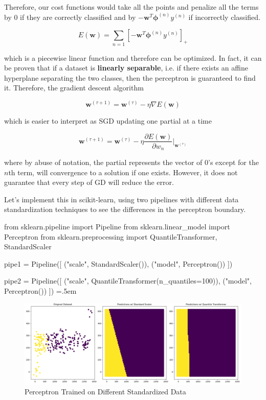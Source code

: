 \documentclass{article}
\theoremstyle{definition}
\newenvironment{cverbatim}
    {\SaveVerbatim{cverb}}
    {\endSaveVerbatim
    \flushleft\fboxrule=0pt\fboxsep=.5em
    \colorbox{cverbbg}{%
      \makebox[\dimexpr\linewidth-2\fboxsep][l]{\BUseVerbatim{cverb}}%
    }
    \endflushleft
  }
\begin{document}
  Therefore, our cost functions would take all the points and penalize all the terms by $0$ if they are correctly classified and by $-\mathbf{w}^T \boldsymbol{\phi}^{(n)} y^{(n)}$ if incorrectly classified. 

    \[E(\mathbf{w}) = \sum_{n=1} [ -\mathbf{w}^T \boldsymbol{\phi}^{(n)} y^{(n)} ]_+\]

  which is a piecewise linear function and therefore can be optimized. In fact, it can be proven that if a dataset is \textbf{linearly separable}, i.e. if there exists an affine hyperplane separating the two classes, then the perceptron is guaranteed to find it. Therefore, the gradient descent algorithm

    \[\mathbf{w}^{(\tau + 1)} = \mathbf{w}^{(\tau)} - \eta \nabla E(\mathbf{w})\]

  which is easier to interpret as SGD updating one partial at a time

    \[\mathbf{w}^{(\tau + 1)} = \mathbf{w}^{(\tau)} - \eta \frac{\partial E(\mathbf{w})}{\partial w_n} \bigg|_{\mathbf{w}^{(\tau)}}\]

  where by abuse of notation, the partial represents the vector of $0$'s except for the $n$th term, will convergence to a solution if one exists. However, it does not guarantee that every step of GD will reduce the error. 

  Let's implement this in scikit-learn, using two pipelines with different data standardization techniques to see the differences in the perceptron boundary. 

  \begin{cverbatim}
  from sklearn.pipeline import Pipeline 
  from sklearn.linear_model import Perceptron
  from sklearn.preprocessing import QuantileTransformer, StandardScaler

  pipe1 = Pipeline([ 
      ("scale", StandardScaler()), 
      ("model", Perceptron())
  ])

  pipe2 = Pipeline([
      ("scale", QuantileTransformer(n_quantiles=100)), 
      ("model", Perceptron())
  ])
  \end{cverbatim}

  \begin{figure}[hbt!]
    \centering
    \includegraphics[scale=0.4]{img/Perceptron.png}
    \caption{Perceptron Trained on Different Standardized Data}
    \label{fig:Percepton_on_Standardized_data}
  \end{figure}
\end{document}
